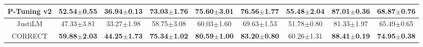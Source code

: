 \begin{table*}[t]
{\begin{tabular}{c|cc|cc|cc|cc}
                \hline
                P-Tuning v2 & 52.54$ \pm $0.55 & 36.94$ \pm $0.13 & 73.03$ \pm $1.76 & 75.60$ \pm $3.01 & 76.56$ \pm $1.77 & 55.48$ \pm $2.04 & 87.01$ \pm $0.36 & 68.87$ \pm $0.76 \\
                \hline
                JustiLM & 47.33$ \pm $3.81 & 33.27$ \pm $1.98 & 58.75$ \pm $3.08 & 60.03$ \pm $1.60 & 69.63$ \pm $1.53 & 51.78$ \pm $0.80 & 81.33$ \pm $1.97 & 65.49$ \pm $0.65 \\
                \hline
                CORRECT & \textbf{59.88}$ \pm $\textbf{2.03} & \textbf{44.25}$ \pm $\textbf{1.73} & \textbf{75.34}$ \pm $\textbf{1.02} & \textbf{80.59}$ \pm $\textbf{1.00} & \textbf{83.20}$ \pm $\textbf{0.80} & 60.26$ \pm $1.31 & \textbf{88.41}$ \pm $\textbf{0.19} & \textbf{74.95}$ \pm $\textbf{0.38} \\
			\bottomrule
		\end{tabular}
	}
	\label{table:fully_supervised_macro_f1}
\end{table*}

